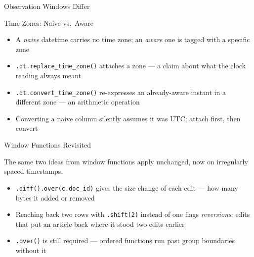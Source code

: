 \documentclass[8pt,aspectratio=169]{beamer}
\begin{document}
\begin{rightframe}{Observation Windows Differ}
\end{rightframe}

\begin{textframe}{Time Zones: Naive vs.\ Aware}

\begin{itemize}
\item A \textit{naive} datetime carries no time zone; an \textit{aware} one is tagged with a specific zone
\item \texttt{.dt.replace\_time\_zone()} attaches a zone --- a claim about what the clock reading always meant
\item \texttt{.dt.convert\_time\_zone()} re-expresses an already-aware instant in a different zone --- an arithmetic operation
\item Converting a naive column silently assumes it was UTC; attach first, then convert
\end{itemize}

\end{textframe}

\begin{textframe}{Window Functions Revisited}

The same two ideas from window functions apply unchanged, now on irregularly spaced timestamps.

\begin{itemize}
\item \texttt{.diff().over(c.doc\_id)} gives the size change of each edit --- how many bytes it added or removed
\item Reaching back two rows with \texttt{.shift(2)} instead of one flags \textit{reversions}: edits that put an article back where it stood two edits earlier
\item \texttt{.over()} is still required --- ordered functions run past group boundaries without it
\end{itemize}

\end{textframe}
\end{document}
